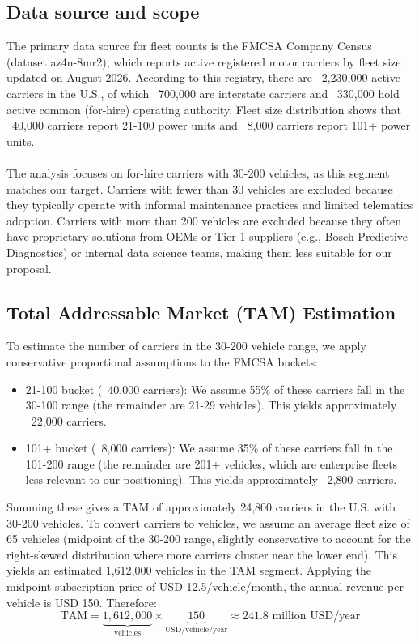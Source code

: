 \documentclass[11pt,a4paper]{article}
\begin{document}
\subsection{Data source and scope}
The primary data source for fleet counts is the FMCSA Company Census (dataset az4n-8mr2), which reports active registered motor carriers by fleet size updated on August 2026. According to this registry, there are ~2,230,000 active carriers in the U.S., of which ~700,000 are interstate carriers and ~330,000 hold active common (for-hire) operating authority. Fleet size distribution shows that ~40,000 carriers report 21-100 power units and ~8,000 carriers report 101+ power units.
\\
\\
The analysis focuses on for-hire carriers with 30-200 vehicles, as this segment matches our target. Carriers with fewer than 30 vehicles are excluded because they typically operate with informal maintenance practices and limited telematics adoption. Carriers with more than 200 vehicles are excluded because they often have proprietary solutions from OEMs or Tier-1 suppliers (e.g., Bosch Predictive Diagnostics) or internal data science teams, making them less suitable for our proposal.

\subsection{Total Addressable Market (TAM) Estimation}
To estimate the number of carriers in the 30-200 vehicle range, we apply conservative proportional assumptions to the FMCSA buckets:
\begin{itemize}
    \item 21-100 bucket (~40,000 carriers): We assume 55\% of these carriers fall in the 30-100 range (the remainder are 21-29 vehicles). This yields approximately ~22,000 carriers.
    \item 101+ bucket (~8,000 carriers): We assume 35\% of these carriers fall in the 101-200 range (the remainder are 201+ vehicles, which are enterprise fleets less relevant to our positioning). This yields approximately ~2,800 carriers.
\end{itemize}
Summing these gives a TAM of approximately 24,800 carriers in the U.S. with 30-200 vehicles.
To convert carriers to vehicles, we assume an average fleet size of 65 vehicles (midpoint of the 30-200 range, slightly conservative to account for the right-skewed distribution where more carriers cluster near the lower end). This yields an estimated 1,612,000 vehicles in the TAM segment.
Applying the midpoint subscription price of USD 12.5/vehicle/month, the annual revenue per vehicle is USD 150. Therefore:
\begin{equation}
    \text{TAM} = \underbrace{1{,}612{,}000}_{\text{vehicles}} \times \underbrace{150}_{\text{USD/vehicle/year}} \approx 241.8 \text{ million USD/year}
\end{equation}
\end{document}
